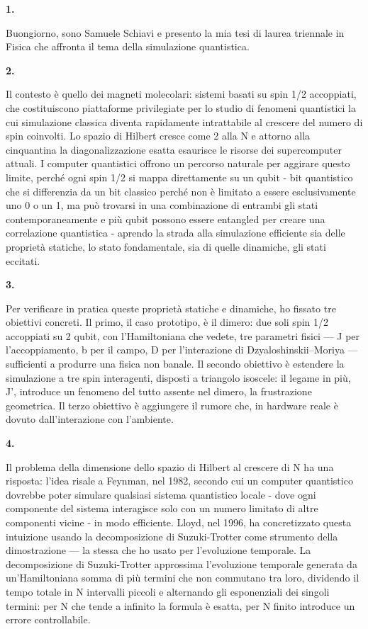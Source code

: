 \documentclass[12pt,a4paper]{article}
\newcommand{\slidenum}[1]{%
  \par\vspace{0.55cm}
  {\bfseries\large #1.}\quad
}
\begin{document}
\slidenum{1}
Buongiorno, sono Samuele Schiavi e presento la mia tesi di laurea triennale in Fisica che affronta il tema della simulazione quantistica.

\slidenum{2}
Il contesto è quello dei magneti molecolari: sistemi basati su spin 1/2 accoppiati, che costituiscono piattaforme privilegiate per lo studio di fenomeni quantistici la cui simulazione classica diventa rapidamente intrattabile al crescere del numero di spin coinvolti. Lo spazio di Hilbert cresce come 2 alla N e attorno alla cinquantina la diagonalizzazione esatta esaurisce le risorse dei supercomputer attuali. I computer quantistici offrono un percorso naturale per aggirare questo limite, perché ogni spin 1/2 si mappa direttamente su un qubit - bit quantistico che si differenzia da un bit classico perché non è limitato a essere esclusivamente uno 0 o un 1, ma può trovarsi in una combinazione di entrambi gli stati contemporaneamente e più qubit possono essere entangled per creare una correlazione quantistica - aprendo la strada alla simulazione efficiente sia delle proprietà statiche, lo stato fondamentale, sia di quelle dinamiche, gli stati eccitati.

\slidenum{3}
Per verificare in pratica queste proprietà statiche e dinamiche, ho fissato tre obiettivi concreti. Il primo, il caso prototipo, è il dimero: due soli spin 1/2 accoppiati su 2 qubit, con l'Hamiltoniana che vedete, tre parametri fisici --- J per l'accoppiamento, b per il campo, D per l'interazione di Dzyaloshinskii--Moriya --- sufficienti a produrre una fisica non banale. Il secondo obiettivo è estendere la simulazione a tre spin interagenti, disposti a triangolo isoscele: il legame in più, J', introduce un fenomeno del tutto assente nel dimero, la frustrazione geometrica. Il terzo obiettivo è aggiungere il rumore che, in hardware reale è dovuto dall'interazione con l'ambiente.

\slidenum{4}
Il problema della dimensione dello spazio di Hilbert al crescere di N ha una risposta: l'idea risale a Feynman, nel 1982, secondo cui un computer quantistico dovrebbe poter simulare qualsiasi sistema quantistico locale - dove ogni componente del sistema interagisce solo con un numero limitato di altre componenti vicine - in modo efficiente. Lloyd, nel 1996, ha concretizzato questa intuizione usando la decomposizione di Suzuki-Trotter come strumento della dimostrazione --- la stessa che ho usato per l'evoluzione temporale. La decomposizione di Suzuki-Trotter approssima l'evoluzione temporale generata da un'Hamiltoniana somma di più termini che non commutano tra loro, dividendo il tempo totale in N intervalli piccoli e alternando gli esponenziali dei singoli termini: per N che tende a infinito la formula è esatta, per N finito introduce un errore controllabile.
\end{document}
